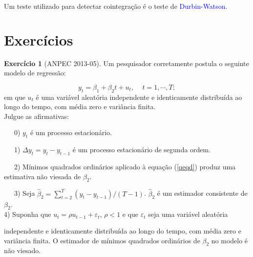 \documentclass[
]{book}
\theoremstyle{definition}
\theoremstyle{definition}
\theoremstyle{definition}
\newtheorem{exercise}{Exercício}[chapter]
\theoremstyle{remark}
\begin{document}
Um teste utilizado para detectar cointegração é o teste de \textcolor{blue}{Durbin-Watson}.

\hypertarget{exercuxedcios}{%
\section{Exercícios}\label{exercuxedcios}}

\begin{exercise}[ANPEC 2013-05]
\protect\hypertarget{exr:exns1}{}{\label{exr:exns1} {} }Um pesquisador corretamente postula o seguinte modelo de regressão:

\[
  y_t = \beta_1 + \beta_2t + u_t,\,\,\,\,\,\,\, t = 1,\cdots, T;
\]
em que \(u_t\) é uma variável aleatória independente e identicamente distribuída ao longo do tempo, com média zero e variância finita.\\
Julgue as afirmativas:

~~~0) \(y_t\) é um processo estacionário.

~~~1) \(\Delta y_t = y_t - y_{t-1}\) é um processo estacionário de segunda ordem.

~~~2) Mínimos quadrados ordinários aplicado à equação (\ref{qeqd}) produz uma estimativa não viesada de \(\beta_2\).

~~~3) Seja \(\hat{\beta}_2 =\sum_{t =2}^T (y_t - y_{t-1})/(T - 1)\). \(\hat{\beta}_2\) é um estimador consistente de \(\beta_2\).\\
\hspace*{0.333em}\hspace*{0.333em}\hspace*{0.333em}4) Suponha que \(u_t = \rho u_{t-1} + \varepsilon_t\), \(\rho < 1\) e que \(\varepsilon_t\) seja uma variável aleatória

independente e identicamente distribuída ao longo do tempo, com média zero e variância finita. O estimador de mínimos quadrados ordinários de \(\beta_2\) no modelo é não viesado.
\end{exercise}
\end{document}
